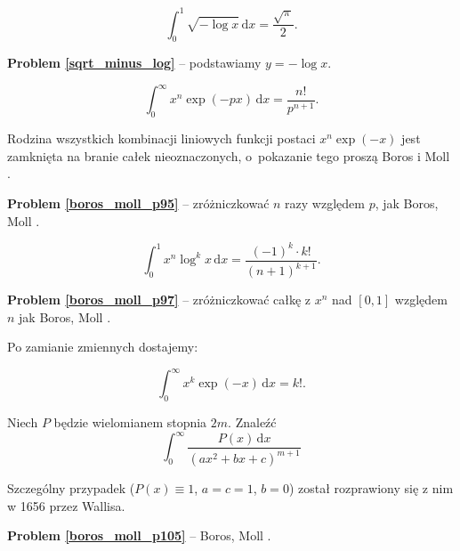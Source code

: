 \begin{problem_with_solution}
\label{sqrt_minus_log}%
    \begin{equation}
        \int_{0}^1 \sqrt{- \log x} \,\mathrm{d} x = \frac{\sqrt \pi}{2}.
    \end{equation}
\end{problem_with_solution}

\textbf{Problem \ref{sqrt_minus_log}} -- podstawiamy $y = - \log x$.

\begin{problem_with_solution}
    \label{boros_moll_p95}%
    \begin{equation}
        \int_0^\infty x^n \exp (-px) \,\mathrm{d}x = \frac{n!}{p^{n+1}}.
    \end{equation}
\end{problem_with_solution}

Rodzina wszystkich kombinacji liniowych funkcji postaci $x^n \exp (-x)$ jest zamknięta na branie całek nieoznaczonych, o~pokazanie tego proszą Boros i Moll \cite[s. 103]{boros94}.

\textbf{Problem \ref{boros_moll_p95}} -- zróżniczkować $n$ razy względem $p$, jak Boros, Moll \cite[s. 95]{boros94}.

\begin{problem_with_solution}
    \label{boros_moll_p97}%
    \begin{equation}
        \int_0^1 x^n \log^k x \,\mathrm{d}x = \frac{(-1)^k \cdot k!}{(n+1)^{k+1}}.
    \end{equation}
\end{problem_with_solution}

\textbf{Problem \ref{boros_moll_p97}} -- zróżniczkować całkę z $x^n$ nad $[0, 1]$ względem $n$ jak Boros, Moll \cite[s. 97]{boros94}.

Po zamianie zmiennych dostajemy:

\begin{problem}
    \begin{equation}
        \int_0^\infty x^k \exp (-x) \,\mathrm{d}x = k!.
    \end{equation}
\end{problem}


\begin{problem_with_solution}
    Niech $P$ będzie wielomianem stopnia $2m$. Znaleźć
    \label{boros_moll_p105}%
    \begin{equation}
        \int_0^\infty \frac{P(x) \,\mathrm{d}x}{(ax^2 + bx + c)^{m+1}}
    \end{equation}
\end{problem_with_solution}

Szczególny przypadek ($P(x) \equiv 1$, $a = c = 1$, $b = 0$) został rozprawiony się z nim w 1656 przez Wallisa.

\textbf{Problem \ref{boros_moll_p105}} -- Boros, Moll \cite[s. 105--koniecrozdziału6]{boros94}.
